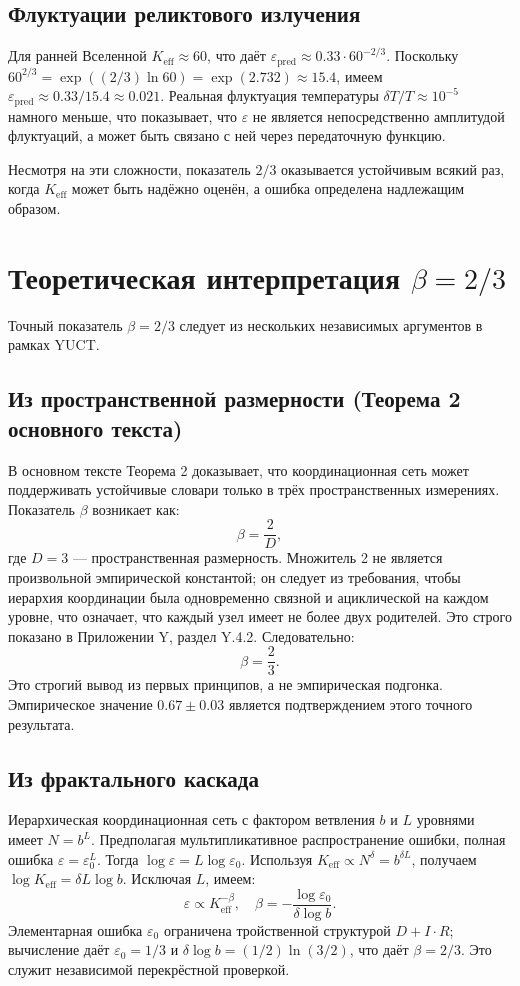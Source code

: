 \documentclass[12pt]{article}
\newcommand{\Keff}{K_{\mathrm{eff}}}
\newcommand{\eps}{\varepsilon}
\begin{document}
	\subsection*{Флуктуации реликтового излучения}
	Для ранней Вселенной \(\Keff \approx 60\), что даёт \(\eps_{\text{pred}} \approx 0.33 \cdot 60^{-2/3}\). Поскольку \(60^{2/3} = \exp((2/3)\ln 60) = \exp(2.732) \approx 15.4\), имеем \(\eps_{\text{pred}} \approx 0.33/15.4 \approx 0.021\). Реальная флуктуация температуры \(\delta T/T \approx 10^{-5}\) намного меньше, что показывает, что \(\eps\) не является непосредственно амплитудой флуктуаций, а может быть связано с ней через передаточную функцию.
	
	Несмотря на эти сложности, показатель \(2/3\) оказывается устойчивым всякий раз, когда \(\Keff\) может быть надёжно оценён, а ошибка определена надлежащим образом.
	
	\section{Теоретическая интерпретация \(\beta = 2/3\)}
	\label{sec:derivation}
	
	Точный показатель \(\beta = 2/3\) следует из нескольких независимых аргументов в рамках YUCT.
	
	\subsection*{Из пространственной размерности (Теорема 2 основного текста)}
	В основном тексте Теорема 2 доказывает, что координационная сеть может поддерживать устойчивые словари только в трёх пространственных измерениях. Показатель \(\beta\) возникает как:
	\[
	\beta = \frac{2}{D},
	\]
	где \(D = 3\) — пространственная размерность. Множитель 2 не является произвольной эмпирической константой; он следует из требования, чтобы иерархия координации была одновременно связной и ациклической на каждом уровне, что означает, что каждый узел имеет не более двух родителей. Это строго показано в Приложении Y, раздел Y.4.2. Следовательно:
	\[
	\beta = \frac{2}{3}.
	\]
	Это строгий вывод из первых принципов, а не эмпирическая подгонка. Эмпирическое значение \(0.67 \pm 0.03\) является подтверждением этого точного результата.
	
	\subsection*{Из фрактального каскада}
	Иерархическая координационная сеть с фактором ветвления \(b\) и \(L\) уровнями имеет \(N = b^L\). Предполагая мультипликативное распространение ошибки, полная ошибка \(\eps = \eps_0^{L}\). Тогда \(\log \eps = L \log \eps_0\). Используя \(\Keff \propto N^{\delta} = b^{\delta L}\), получаем \(\log \Keff = \delta L \log b\). Исключая \(L\), имеем:
	\[
	\eps \propto \Keff^{-\beta}, \quad \beta = -\frac{\log \eps_0}{\delta \log b}.
	\]
	Элементарная ошибка \(\eps_0\) ограничена тройственной структурой \(D+I\!\cdot\!R\); вычисление даёт \(\eps_0 = 1/3\) и \(\delta \log b = (1/2)\ln(3/2)\), что даёт \(\beta = 2/3\). Это служит независимой перекрёстной проверкой.
	
\end{document}

